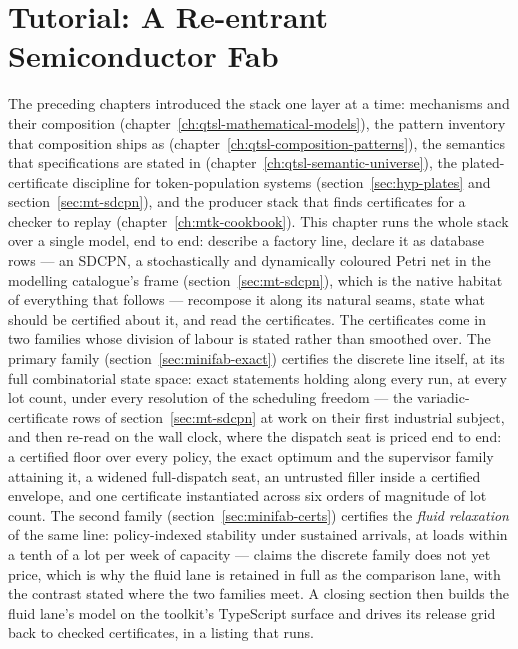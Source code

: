 \chapter{Tutorial: A Re-entrant Semiconductor Fab}
\label{ch:qtsl-minifab}


\noindent\draftmark\medskip

The preceding chapters introduced the stack one layer at a time:
mechanisms and their composition (chapter~\ref{ch:qtsl-mathematical-models}),
the pattern inventory that composition ships as
(chapter~\ref{ch:qtsl-composition-patterns}), the semantics that
specifications are stated in
(chapter~\ref{ch:qtsl-semantic-universe}), the plated-certificate
discipline for token-population systems (section~\ref{sec:hyp-plates}
and section~\ref{sec:mt-sdcpn}), and the producer stack that finds
certificates for a checker to replay (chapter~\ref{ch:mtk-cookbook}).
This chapter runs the whole stack over a single model, end to end:
describe a factory line, declare it as database rows --- an SDCPN, a
stochastically and dynamically coloured Petri net in the modelling
catalogue's frame (section~\ref{sec:mt-sdcpn}), which is the native
habitat of everything that follows --- recompose it along its natural
seams, state what should be certified about it, and read the
certificates. The certificates come in two families whose
division of labour is stated rather than smoothed over. The primary family
(section~\ref{sec:minifab-exact}) certifies the discrete line itself,
at its full combinatorial state space: exact statements holding along
every run, at every lot count, under every resolution of the
scheduling freedom --- the variadic-certificate rows of
section~\ref{sec:mt-sdcpn} at work on their first industrial
subject, and then re-read on the wall clock, where the dispatch
seat is priced end to end: a certified floor over every policy, the
exact optimum and the supervisor family attaining it, a widened
full-dispatch seat, an untrusted filler inside a certified
envelope, and one certificate instantiated across six orders of
magnitude of lot count.
The second family (section~\ref{sec:minifab-certs}) certifies the
\emph{fluid relaxation} of the same line: policy-indexed stability
under sustained arrivals, at loads within a tenth of a lot per week
of capacity --- claims the discrete family does not yet price, which
is why the fluid lane is retained in full as the comparison lane,
with the contrast stated where the two families meet. A closing
section then builds the fluid lane's model on the toolkit's
TypeScript surface and drives its release grid back to checked
certificates, in a listing that runs.

